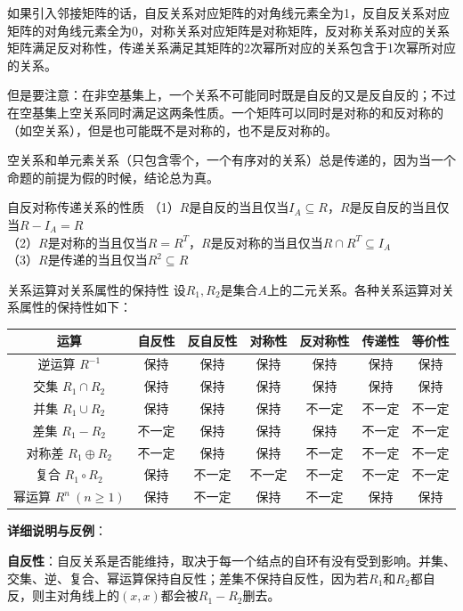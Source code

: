 如果引入邻接矩阵的话，自反关系对应矩阵的对角线元素全为1，反自反关系对应矩阵的对角线元素全为0，对称关系对应矩阵是对称矩阵，反对称关系对应的关系矩阵满足反对称性，传递关系满足其矩阵的2次幂所对应的关系包含于1次幂所对应的关系。

但是要注意：在非空基集上，一个关系不可能同时既是自反的又是反自反的；不过在空基集上空关系同时满足这两条性质。一个矩阵可以同时是对称的和反对称的（如空关系），但是也可能既不是对称的，也不是反对称的。

空关系和单元素关系（只包含零个，一个有序对的关系）总是传递的，因为当一个命题的前提为假的时候，结论总为真。
\begin{theorem}{自反对称传递关系的性质}{}
（1）$R$是自反的当且仅当$I_A\subseteq R$，$R$是反自反的当且仅当$R-I_A=R$\\
（2）$R$是对称的当且仅当$R=R^T$，$R$是反对称的当且仅当$R\cap R^T\subseteq I_A$\\
（3）$R$是传递的当且仅当$R^2\subseteq R$
\end{theorem}
\begin{theorem}{关系运算对关系属性的保持性}{}
设$R_1, R_2$是集合$A$上的二元关系。各种关系运算对关系属性的保持性如下：
\begin{center}
\begin{tabular}{|c|c|c|c|c|c|c|}
\hline
运算 & 自反性 & 反自反性 & 对称性 & 反对称性 & 传递性 & 等价性 \\
\hline
逆运算 $R^{-1}$ & 保持 & 保持 & 保持 & 保持 & 保持 & 保持 \\
\hline
交集 $R_1 \cap R_2$ & 保持 & 保持 & 保持 & 保持 & 保持 & 保持 \\
\hline
并集 $R_1 \cup R_2$ & 保持 & 保持 & 保持 & 不一定 & 不一定 & 不一定 \\
\hline
差集 $R_1 - R_2$ & 不一定 & 保持 & 保持 & 保持 & 不一定 & 不一定 \\
\hline
对称差 $R_1 \oplus R_2$ & 不一定 & 保持 & 保持 & 不一定 & 不一定 & 不一定 \\
\hline
复合 $R_1 \circ R_2$ & 保持 & 不一定 & 不一定 & 不一定 & 不一定 & 不一定 \\
\hline
幂运算 $R^n~(n\geqslant1)$ & 保持 & 不一定 & 保持 & 不一定 & 保持 & 保持 \\
\hline
\end{tabular}
\end{center}
\end{theorem}
\textbf{详细说明与反例}：

\textbf{自反性}：自反关系是否能维持，取决于每一个结点的自环有没有受到影响。并集、交集、逆、复合、幂运算保持自反性；差集不保持自反性，因为若$R_1$和$R_2$都自反，则主对角线上的$(x,x)$都会被$R_1-R_2$删去。

